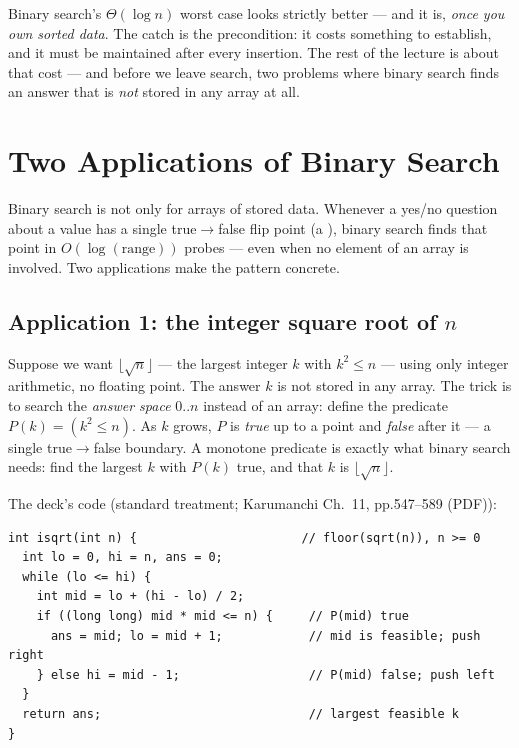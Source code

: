 \documentclass[11pt]{article}
\begin{document}
Binary search's $\Theta(\log n)$ worst case looks strictly better --- and it is, \emph{once you own sorted data}. The catch is the precondition: it costs something to establish, and it must be maintained after every insertion. The rest of the lecture is about that cost --- and before we leave search, two problems where binary search finds an answer that is \emph{not} stored in any array at all.

\section{Two Applications of Binary Search}
\label{sec:apps}

Binary search is not only for arrays of stored data. Whenever a yes/no question about a value has a single true$\to$false flip point (a ), binary search finds that point in $O(\log(\text{range}))$ probes --- even when no element of an array is involved. Two applications make the pattern concrete.

\subsection{Application 1: the integer square root of $n$}

Suppose we want $\lfloor \sqrt{n} \rfloor$ --- the largest integer $k$ with $k^2 \le n$ --- using only integer arithmetic, no floating point. The answer $k$ is not stored in any array. The trick is to search the \emph{answer space} $0..n$ instead of an array: define the predicate $P(k) = (k^2 \le n)$. As $k$ grows, $P$ is \emph{true} up to a point and \emph{false} after it --- a single true$\to$false boundary. A monotone predicate is exactly what binary search needs: find the largest $k$ with $P(k)$ true, and that $k$ is $\lfloor \sqrt{n} \rfloor$.

The deck's code (standard treatment; Karumanchi Ch.~11, pp.547--589 (PDF)):

{\footnotesize
\begin{verbatim}
int isqrt(int n) {                       // floor(sqrt(n)), n >= 0
  int lo = 0, hi = n, ans = 0;
  while (lo <= hi) {
    int mid = lo + (hi - lo) / 2;
    if ((long long) mid * mid <= n) {     // P(mid) true
      ans = mid; lo = mid + 1;            // mid is feasible; push right
    } else hi = mid - 1;                  // P(mid) false; push left
  }
  return ans;                             // largest feasible k
}
\end{verbatim}
}
\end{document}
